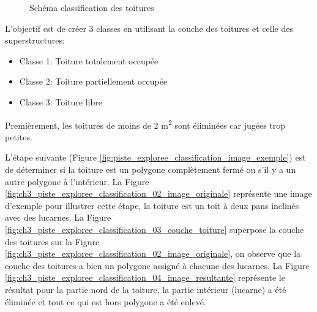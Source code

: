 \begin{figure}[H]
    \centering
    \caption{Schéma classification des toitures}
    \label{fig:ch3_piste_exploree_classification_01_workflow}
\end{figure}

L'objectif est de créer 3 classes en utilisant la couche des toitures et celle des superstructures:
\begin{itemize}
    \item Classe 1: Toiture totalement occupée
    \item Classe 2: Toiture partiellement occupée
    \item Classe 3: Toiture libre
\end{itemize}
Premièrement, les toitures de moins de 2 \si{\unit{\square\meter}} sont éliminées car jugées trop petites.

L'étape suivante (Figure \ref{fig:piste_exploree_classification_image_exemple}) est de déterminer si la toiture est un polygone complètement fermé ou s'il y a un autre polygone à l'intérieur. La Figure \ref{fig:ch3_piste_exploree_classification_02_image_originale} représente une image d'exemple pour illustrer cette étape, la toiture est un toit à deux pans inclinés avec des lucarnes. La Figure \ref{fig:ch3_piste_exploree_classification_03_couche_toiture} superpose la couche des toitures sur la Figure \ref{fig:ch3_piste_exploree_classification_02_image_originale}, on observe que la couche des toitures a bien un polygone assigné à chacune des lucarnes. La Figure \ref{fig:ch3_piste_exploree_classification_04_image_resultante} représente le résultat pour la partie nord de la toiture, la partie intérieur (lucarne) a été éliminée et tout ce qui est hors polygone a été enlevé.

